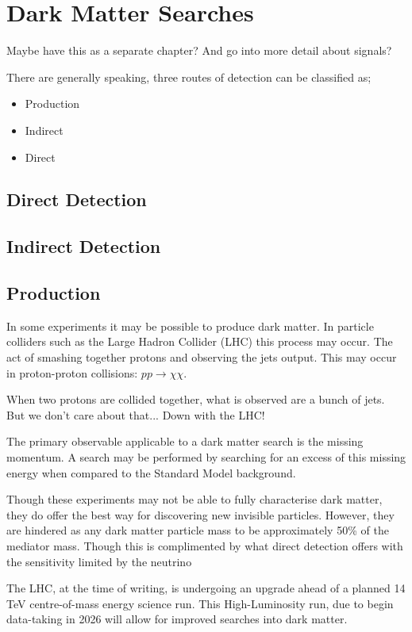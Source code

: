 \section{Dark Matter Searches}
\par
Maybe have this as a separate chapter? And go into more detail about signals?

\par
There are generally speaking, three routes of detection can be classified as;

\begin{itemize}
    \item Production
    \item Indirect
    \item Direct
\end{itemize}
    
    

\subsection{Direct Detection}

\subsection{Indirect Detection}

\subsection{Production}
\par
In some experiments it may be possible to produce dark matter.
In particle colliders such as the Large Hadron Collider (LHC) this process may occur.
The act of smashing together protons and observing the jets output.
This may occur in proton-proton collisions: $pp\xrightarrow{}\chi\chi$.

\par
When two protons are collided together, what is observed are a bunch of jets. 
But we don't care about that... Down with the LHC!

\par
The primary observable applicable to a dark matter search is the missing momentum.
A search may be performed by searching for an excess of this missing energy when compared to the Standard Model background.





\par
Though these experiments may not be able to fully characterise dark matter, they do offer the best way for discovering new invisible particles.
However, they are hindered as any dark matter particle mass to be approximately 50\% of the mediator mass.
Though this is complimented by what direct detection offers with the sensitivity limited by the neutrino
\par
The LHC, at the time of writing, is undergoing an upgrade ahead of a planned 14 TeV centre-of-mass energy science run. 
This High-Luminosity run, due to begin data-taking in 2026 will allow for improved searches into dark matter.

